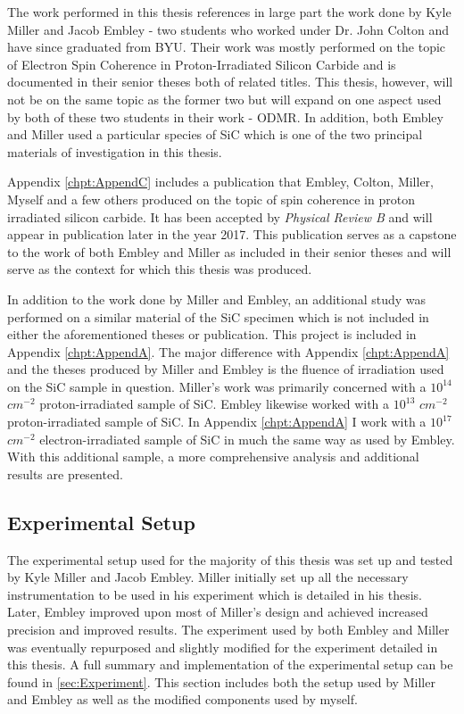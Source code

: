 \documentclass[oneside, astronomy, noacknowlegments]{BYUPhys}
\begin{document}
The work performed in this thesis references in large part the work done by Kyle Miller and Jacob Embley - two students who worked under Dr. John Colton and have since graduated from BYU. Their work was mostly performed on the topic of Electron Spin Coherence in Proton-Irradiated Silicon Carbide and is documented in their senior theses both of related titles. This thesis, however, will not be on the same topic as the former two but will expand on one aspect used by both of these two students in their work - ODMR. In addition, both Embley and Miller used a particular species of SiC which is one of the two principal materials of investigation in this thesis.

Appendix \ref{chpt:AppendC} includes a publication that Embley, Colton, Miller, Myself and a few others produced on the topic of spin coherence in proton irradiated silicon carbide. It has been accepted by \textit{Physical Review B} and will appear in publication later in the year 2017. This publication serves as a capstone to the work of both Embley and Miller as included in their senior theses and will serve as the context for which this thesis was produced.

In addition to the work done by Miller and Embley, an additional study was performed on a similar material of the SiC specimen which is not included in either the aforementioned theses or publication. This project is included in Appendix \ref{chpt:AppendA}. The major difference with Appendix \ref{chpt:AppendA} and the theses produced by Miller and Embley is the fluence of irradiation used on the SiC sample in question. Miller's work was primarily concerned with a $10^{14}$ $cm^{-2}$ proton-irradiated sample of SiC. Embley likewise worked with a $10^{13}$ $cm^{-2}$ proton-irradiated sample of SiC. In Appendix \ref{chpt:AppendA} I work with a $10^{17}$ $cm^{-2}$ electron-irradiated sample of SiC in much the same way as used by Embley. With this additional sample, a more comprehensive analysis and additional results are presented.

\subsection{Experimental Setup}

The experimental setup used for the majority of this thesis was set up and tested by Kyle Miller and Jacob Embley. Miller initially set up all the necessary instrumentation to be used in his experiment which is detailed in his thesis. Later, Embley improved upon most of Miller's design and achieved increased precision and improved results. The experiment used by both Embley and Miller was eventually repurposed and slightly modified for the experiment detailed in this thesis. A full summary and implementation of the experimental setup can be found in \ref{sec:Experiment}. This section includes both the setup used by Miller and Embley as well as the modified components used by myself.
\end{document}
